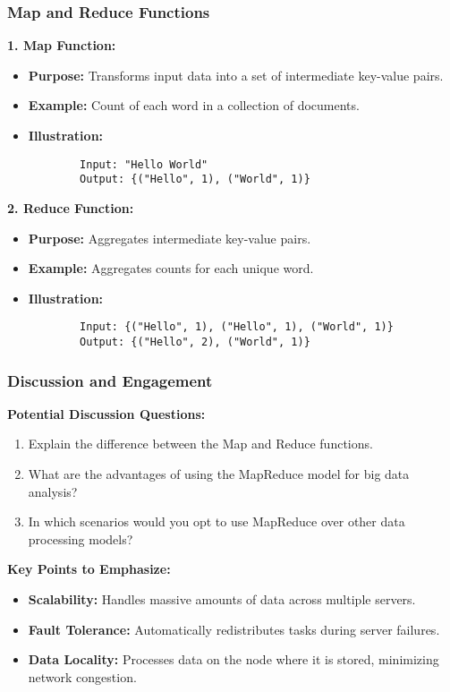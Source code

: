 \documentclass[aspectratio=169]{beamer}
\begin{document}
\begin{frame}[fragile]
    \frametitle{Map and Reduce Functions}
    \textbf{1. Map Function:}
    \begin{itemize}
        \item \textbf{Purpose:} Transforms input data into a set of intermediate key-value pairs.
        \item \textbf{Example:} Count of each word in a collection of documents.
        \item \textbf{Illustration:}
        \begin{lstlisting}
        Input: "Hello World"
        Output: {("Hello", 1), ("World", 1)}
        \end{lstlisting}
    \end{itemize}
    
    \textbf{2. Reduce Function:}
    \begin{itemize}
        \item \textbf{Purpose:} Aggregates intermediate key-value pairs.
        \item \textbf{Example:} Aggregates counts for each unique word.
        \item \textbf{Illustration:}
        \begin{lstlisting}
        Input: {("Hello", 1), ("Hello", 1), ("World", 1)}
        Output: {("Hello", 2), ("World", 1)}
        \end{lstlisting}
    \end{itemize}
\end{frame}

\begin{frame}[fragile]
    \frametitle{Discussion and Engagement}
    \textbf{Potential Discussion Questions:}
    \begin{enumerate}
        \item Explain the difference between the Map and Reduce functions.
        \item What are the advantages of using the MapReduce model for big data analysis?
        \item In which scenarios would you opt to use MapReduce over other data processing models?
    \end{enumerate}

    \textbf{Key Points to Emphasize:}
    \begin{itemize}
        \item \textbf{Scalability:} Handles massive amounts of data across multiple servers.
        \item \textbf{Fault Tolerance:} Automatically redistributes tasks during server failures.
        \item \textbf{Data Locality:} Processes data on the node where it is stored, minimizing network congestion.
    \end{itemize}
\end{frame}
\end{document}

